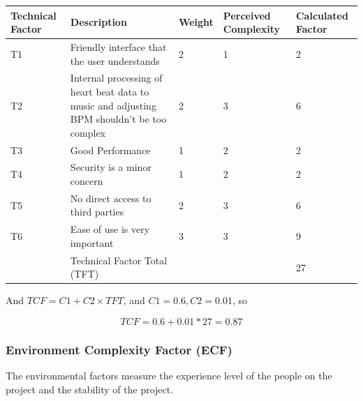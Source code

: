 \documentclass[letterpaper,english, 12pt]{scrreprt}
\begin{document}
\begin{center}
        \begin{tabular}{|C{2cm}|C{5cm}|C{1.5cm}|C{2cm}|C{2cm}|}
                \hline
                        Technical Factor & Description & Weight & Perceived Complexity & Calculated Factor \\
                \hline
                        T1 & Friendly interface that the user understands & 2 & 1 & 2 \\
                \hline
                        T2 & Internal processing of heart beat data to music and adjusting BPM shouldn't be too complex & 2 & 3 & 6\\
                \hline
                        T3 & Good Performance & 1 & 2 & 2 \\
                \hline
                        T4 & Security is a minor concern & 1 & 2 & 2 \\
                \hline
                        T5 & No direct access to third parties & 2 & 3 & 6 \\
                \hline
                        T6 & Ease of use is very important & 3 & 3 & 9\\
                \hline   
                        & Technical Factor Total (TFT) & & & 27 \\
                \hline
        \end{tabular}
\end{center}

And $TCF = C1 + C2 \times TFT$, and $C1 = 0.6, C2 = 0.01$, so

\begin{equation}
TCF = 0.6 + 0.01*27 = 0.87
\end{equation}

\subsubsection{Environment Complexity Factor (ECF)}

The environmental factors measure the experience level of the people on the project and the stability of the project. 
\end{document}

